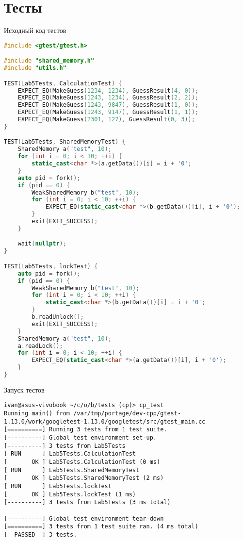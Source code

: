 \documentclass[a4paper, 12pt]{article}
\begin{document}
\newpage
\section{Тесты}

Исходный код тестов
\begin{lstlisting}[language=C++]
#include <gtest/gtest.h>

#include "shared_memory.h"
#include "utils.h"

TEST(Lab5Tests, CalculationTest) {
    EXPECT_EQ(MakeGuess(1234, 1234), GuessResult(4, 0));
    EXPECT_EQ(MakeGuess(1243, 1234), GuessResult(2, 2));
    EXPECT_EQ(MakeGuess(1243, 9847), GuessResult(1, 0));
    EXPECT_EQ(MakeGuess(1243, 9147), GuessResult(1, 1));
    EXPECT_EQ(MakeGuess(2301, 127), GuessResult(0, 3));
}

TEST(Lab5Tests, SharedMemoryTest) {
    SharedMemory a("test", 10);
    for (int i = 0; i < 10; ++i) {
        static_cast<char *>(a.getData())[i] = i + '0';
    }
    auto pid = fork();
    if (pid == 0) {
        WeakSharedMemory b("test", 10);
        for (int i = 0; i < 10; ++i) {
            EXPECT_EQ(static_cast<char *>(b.getData())[i], i + '0');
        }
        exit(EXIT_SUCCESS);
    }

    wait(nullptr);
}

TEST(Lab5Tests, lockTest) {
    auto pid = fork();
    if (pid == 0) {
        WeakSharedMemory b("test", 10);
        for (int i = 0; i < 10; ++i) {
            static_cast<char *>(b.getData())[i] = i + '0';
        }
        b.readUnlock();
        exit(EXIT_SUCCESS);
    }
    SharedMemory a("test", 10);
    a.readLock();
    for (int i = 0; i < 10; ++i) {
        EXPECT_EQ(static_cast<char *>(a.getData())[i], i + '0');
    }
}
\end{lstlisting}

Запуск тестов
\begin{verbatim}
ivan@asus-vivobook ~/c/o/b/tests (cp)> cp_test
Running main() from /var/tmp/portage/dev-cpp/gtest-1.13.0/work/googletest-1.13.0/googletest/src/gtest_main.cc
[==========] Running 3 tests from 1 test suite.
[----------] Global test environment set-up.
[----------] 3 tests from Lab5Tests
[ RUN      ] Lab5Tests.CalculationTest
[       OK ] Lab5Tests.CalculationTest (0 ms)
[ RUN      ] Lab5Tests.SharedMemoryTest
[       OK ] Lab5Tests.SharedMemoryTest (2 ms)
[ RUN      ] Lab5Tests.lockTest
[       OK ] Lab5Tests.lockTest (1 ms)
[----------] 3 tests from Lab5Tests (3 ms total)

[----------] Global test environment tear-down
[==========] 3 tests from 1 test suite ran. (4 ms total)
[  PASSED  ] 3 tests.
\end{verbatim}
\end{document}
